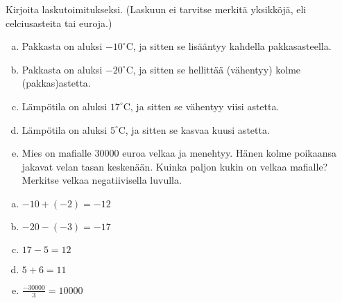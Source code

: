     
        \begin{tehtava}
        Kirjoita laskutoimitukseksi. (Laskuun ei tarvitse merkitä yksikköjä, eli celciusasteita tai euroja.)


        \begin{enumerate}[a)]
            \item Pakkasta on aluksi $-10 ^{\circ}$C, ja sitten se lisääntyy kahdella pakkasasteella.
            \item Pakkasta on aluksi $-20 ^{\circ}$C, ja sitten se hellittää (vähentyy) kolme (pakkas)astetta.
            \item Lämpötila on aluksi $17 ^{\circ}$C, ja sitten se vähentyy viisi astetta.
            \item Lämpötila on aluksi $5 ^{\circ}$C, ja sitten se kasvaa kuusi astetta.
            \item Mies on mafialle $30 000$ euroa velkaa ja menehtyy. Hänen kolme
                poikaansa jakavat velan tasan keskenään. Kuinka paljon kukin on
                velkaa mafialle? Merkitse velkaa negatiivisella luvulla.
        \end{enumerate}
        
        \begin{vastaus}
            \begin{enumerate}[a)]
                \item $-10+(-2)=-12$
                \item $-20-(-3)=-17$
                \item $17-5=12$
                \item $5+6=11$
                \item $\frac{-30 000}{3}=10 000$
            \end{enumerate}
        \end{vastaus}
    \end{tehtava}
    
